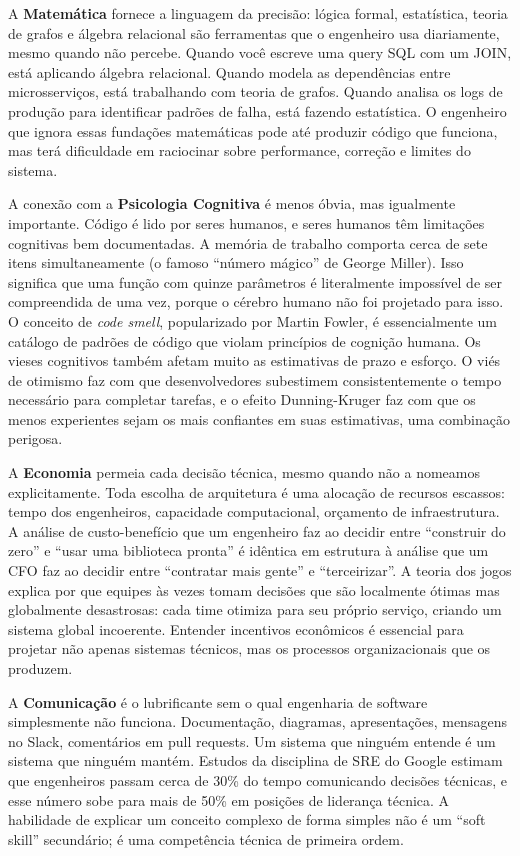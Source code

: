 A \textbf{Matemática} fornece a linguagem da precisão: lógica formal,
estatística, teoria de grafos e álgebra relacional são ferramentas que
o engenheiro usa diariamente, mesmo quando não percebe. Quando você
escreve uma query SQL com um JOIN, está aplicando álgebra relacional.
Quando modela as dependências entre microsserviços, está trabalhando com
teoria de grafos. Quando analisa os logs de produção para identificar
padrões de falha, está fazendo estatística. O engenheiro que ignora essas
fundações matemáticas pode até produzir código que funciona, mas terá
dificuldade em raciocinar sobre performance, correção e limites do sistema.

A conexão com a \textbf{Psicologia Cognitiva} é menos óbvia, mas
igualmente importante. Código é lido por seres humanos, e seres humanos
têm limitações cognitivas bem documentadas. A memória de trabalho comporta
cerca de sete itens simultaneamente (o famoso ``número mágico'' de George
Miller). Isso significa que uma função com quinze parâmetros é literalmente
impossível de ser compreendida de uma vez, porque o cérebro humano não foi
projetado para isso. O conceito de \emph{code smell}, popularizado por
Martin Fowler, é essencialmente um catálogo de padrões de código que
violam princípios de cognição humana. Os vieses cognitivos também
afetam muito as estimativas de prazo e esforço. O viés de otimismo
faz com que desenvolvedores subestimem consistentemente o tempo necessário
para completar tarefas, e o efeito Dunning-Kruger faz com que os menos
experientes sejam os mais confiantes em suas estimativas, uma
combinação perigosa.

A \textbf{Economia} permeia cada decisão técnica, mesmo quando não a
nomeamos explicitamente. Toda escolha de arquitetura é uma alocação de
recursos escassos: tempo dos engenheiros, capacidade computacional,
orçamento de infraestrutura. A análise de custo-benefício que um
engenheiro faz ao decidir entre ``construir do zero'' e ``usar uma
biblioteca pronta'' é idêntica em estrutura à análise que um CFO faz
ao decidir entre ``contratar mais gente'' e ``terceirizar''. A teoria
dos jogos explica por que equipes às vezes tomam decisões que são
localmente ótimas mas globalmente desastrosas: cada time otimiza
para seu próprio serviço, criando um sistema global incoerente.
Entender incentivos econômicos é essencial para projetar não apenas
sistemas técnicos, mas os processos organizacionais que os produzem.

A \textbf{Comunicação} é o lubrificante sem o qual engenharia de software
simplesmente não funciona. Documentação, diagramas, apresentações,
mensagens no Slack, comentários em pull requests. Um sistema que
ninguém entende é um sistema que ninguém mantém. Estudos da disciplina
de SRE do Google estimam que engenheiros passam cerca de 30\% do tempo
comunicando decisões técnicas, e esse número sobe para mais de 50\%
em posições de liderança técnica. A habilidade de explicar um conceito
complexo de forma simples não é um ``soft skill'' secundário; é uma
competência técnica de primeira ordem.

